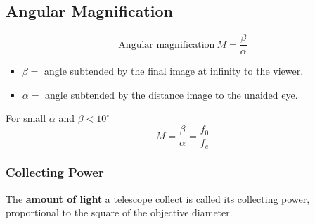 \subsection*{Angular Magnification}

$$\text{Angular magnification}\ M=\frac{\beta}{\alpha}$$
\begin{itemize}
    \item $\beta=$ angle subtended by the final image at infinity to the viewer.
    \item $\alpha=$ angle subtended by the distance image to the unaided eye.
\end{itemize}

For small $\alpha$ and $\beta<10^\circ$
$$M=\frac{\beta}{\alpha}=\frac{f_0}{f_e}$$

\subsubsection*{Collecting Power}

The \textbf{amount of light} a telescope collect is called its collecting power, proportional to the square of the objective diameter.
